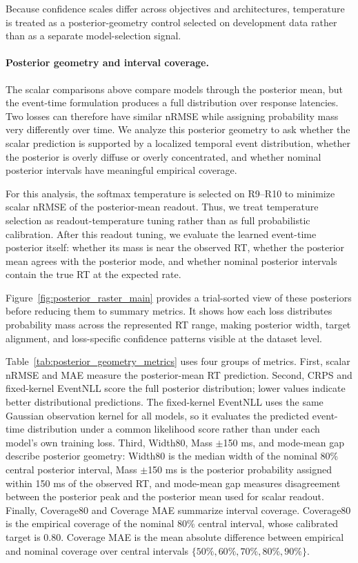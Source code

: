 \documentclass[12pt]{article}
\begin{document}
Because confidence scales differ across objectives and architectures, temperature is treated as a posterior-geometry
control selected on development data rather than as a separate model-selection signal.

\paragraph{Posterior geometry and interval coverage.}
The scalar comparisons above compare models through the posterior mean, but the event-time formulation produces a full distribution over response latencies. Two losses can therefore have similar nRMSE while assigning probability mass very differently over time. We analyze this posterior geometry to ask whether the scalar prediction is supported by a localized temporal event distribution, whether the posterior is overly diffuse or overly concentrated, and whether nominal posterior intervals have meaningful empirical coverage.

For this analysis, the softmax temperature is selected on R9--R10 to minimize scalar nRMSE of the posterior-mean readout. Thus, we treat temperature selection as readout-temperature tuning rather than as full probabilistic calibration. After this readout tuning, we evaluate the learned event-time posterior itself: whether its mass is near the observed RT, whether the posterior mean agrees with the posterior mode, and whether nominal posterior intervals contain the true RT at the expected rate.

Figure~\ref{fig:posterior_raster_main} provides a trial-sorted view of these posteriors before reducing them to summary metrics. It shows how each loss distributes probability mass across the represented RT range, making posterior width, target alignment, and loss-specific confidence patterns visible at the dataset level.

Table~\ref{tab:posterior_geometry_metrics} uses four groups of metrics. First, scalar nRMSE and MAE measure the posterior-mean RT prediction. Second, CRPS and fixed-kernel EventNLL score the full posterior distribution; lower values indicate better distributional predictions. The fixed-kernel EventNLL uses the same Gaussian observation kernel for all models, so it evaluates the predicted event-time distribution under a common likelihood score rather than under each model's own training loss. Third, Width80, Mass $\pm$150 ms, and mode-mean gap describe posterior geometry: Width80 is the median width of the nominal 80\% central posterior interval, Mass $\pm$150 ms is the posterior probability assigned within 150 ms of the observed RT, and mode-mean gap measures disagreement between the posterior peak and the posterior mean used for scalar readout. Finally, Coverage80 and Coverage MAE summarize interval coverage. Coverage80 is the empirical coverage of the nominal 80\% central interval, whose calibrated target is 0.80. Coverage MAE is the mean absolute difference between empirical and nominal coverage over central intervals $\{50\%,60\%,70\%,80\%,90\%\}$.
\end{document}
